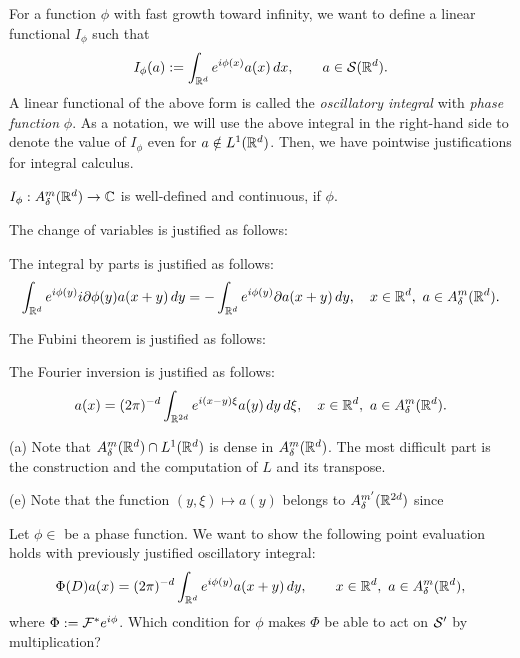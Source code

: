 \documentclass{../../large}
\begin{document}
\begin{prb}
For a function $\phi$ with fast growth toward infinity, we want to define a linear functional $I_\phi$ such that
\[I_\phi(a):=\int_{\mathbb{R}^d}e^{i\phi(x)}a(x)\,dx,\qquad a\in\mathcal{S}(\mathbb{R}^d).\]
A linear functional of the above form is called the \emph{oscillatory integral} with \emph{phase function} $\phi$.
As a notation, we will use the above integral in the right-hand side to denote the value of $I_\phi$ even for $a\notin L^1(\mathbb{R}^d)$.
Then, we have pointwise justifications for integral calculus.
\begin{parts}
\item $I_\phi:A_\delta^m(\mathbb{R}^d)\to\mathbb{C}$ is well-defined and continuous, if $\phi$.
\item The change of variables is justified as follows:
\item The integral by parts is justified as follows:
\[\int_{\mathbb{R}^d}e^{i\phi(y)}i\partial\phi(y)a(x+y)\,dy=-\int_{\mathbb{R}^d}e^{i\phi(y)}\partial a(x+y)\,dy,\quad x\in\mathbb{R}^d,\ a\in A_\delta^m(\mathbb{R}^d).\]
\item The Fubini theorem is justified as follows:
\item The Fourier inversion is justified as follows:
\[a(x)=(2\pi)^{-d}\int_{\mathbb{R}^{2d}}e^{i(x-y)\xi}a(y)\,dy\,d\xi,\quad x\in\mathbb{R}^d,\ a\in A_\delta^m(\mathbb{R}^d).\]
\end{parts}
\end{prb}
\begin{pf}
(a)
Note that $A_\delta^m(\mathbb{R}^d)\cap L^1(\mathbb{R}^d)$ is dense in $A_\delta^m(\mathbb{R}^d)$.
The most difficult part is the construction and the computation of $L$ and its transpose.

(e)
Note that the function $(y,\xi)\mapsto a(y)$ belongs to $A_\delta^{m'}(\mathbb{R}^{2d})$ since
\end{pf}

\begin{prb}
Let $\phi\in$ be a phase function.
We want to show the following point evaluation holds with previously justified oscillatory integral:
\[\Phi(D)a(x)=(2\pi)^{-d}\int_{\mathbb{R}^d}e^{i\phi(y)}a(x+y)\,dy,\qquad x\in\mathbb{R}^d,\ a\in A_\delta^m(\mathbb{R}^d),\]
where $\Phi:=\mathcal{F}^*e^{i\phi}$.
Which condition for $\phi$ makes $\Phi$ be able to act on $\mathcal{S}'$ by multiplication?
\end{prb}



\begin{prb}

\end{prb}
\begin{pf}

\end{pf}
\end{document}
